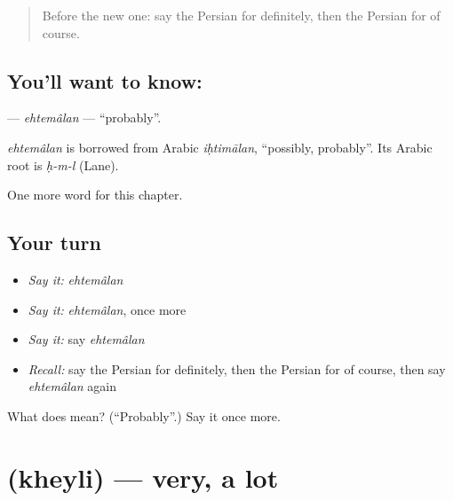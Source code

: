 \label{lesson:FA-C233-ehtemalan}



\begin{quote}
Before the new one: say the Persian for definitely, then the Persian for of course.
\end{quote}

\subsection*{You'll want to know: }
\textbf{} — \emph{ehtemâlan} — \textquotedblleft{}probably\textquotedblright{}.

\begin{cousinweb}
\emph{ehtemâlan} is borrowed from Arabic \emph{iḥtimālan}, \textquotedblleft{}possibly, probably\textquotedblright{}. Its Arabic root is \emph{ḥ-m-l} (Lane).
\end{cousinweb}

\begin{grammarlens}[title={What you've built}]
One more word for this chapter.
\end{grammarlens}

\subsection*{Your turn}
\begin{itemize}
\raggedright
  \item \emph{Say it:} \emph{ehtemâlan}
  \item \emph{Say it:} \emph{ehtemâlan}, once more
  \item \emph{Say it:} say \emph{ehtemâlan}
  \item \emph{Recall:} say the Persian for definitely, then the Persian for of course, then say \emph{ehtemâlan} again
\end{itemize}

\begin{tcolorbox}[breakable,colback=teal!4,colframe=teal!35!black,title={Before you move on}]
What does  mean? (\textquotedblleft{}Probably\textquotedblright{}.) Say it once more.
\end{tcolorbox}
\section[\texorpdfstring{\fa{خیلی} (kheyli)}{خیلی (kheyli)}]{ (kheyli) — very, a lot}

\label{lesson:FA-C233-kheyli}



